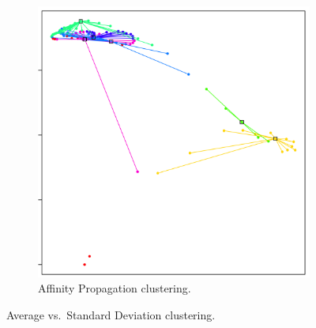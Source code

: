 \documentclass[11pt, letterpaper]{article}            %
\begin{document}
\begin{figure}[htbp]
\begin{subfigure}[b]{0.32\textwidth}
    \includegraphics[height=\textwidth]{./gfx/ap12.png}
    \caption{Affinity Propagation clustering.\label{fig:avgstd:ap}}
  \end{subfigure}

  \caption{Average vs.\ Standard Deviation clustering.\label{fig:avgstd}}
\end{figure}
\end{document}
